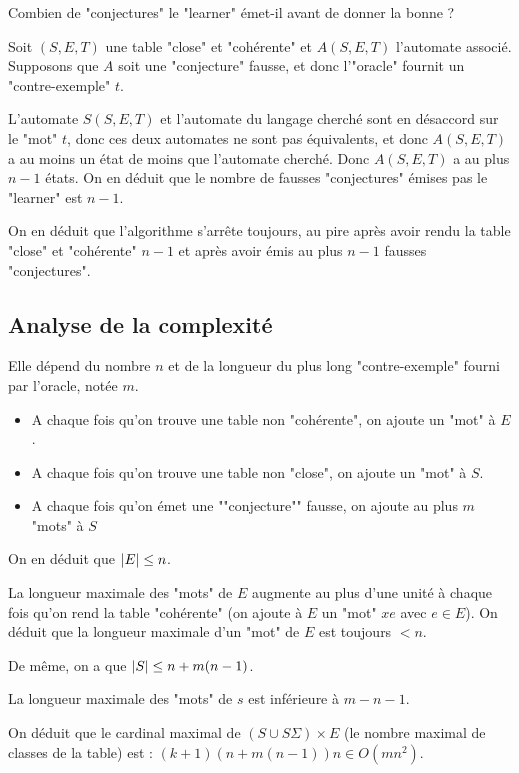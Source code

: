 Combien de "conjectures" le "learner" émet-il avant de donner la bonne ?

Soit $(S,E,T)$ une table "close" et "cohérente" et $A(S,E,T)$ l'automate associé.
Supposons que $A$ soit une "conjecture" fausse, et donc l'"oracle" fournit un "contre-exemple" $t$.

L'automate $S(S,E,T)$ et l'automate du langage cherché sont en désaccord sur le "mot" $t$, donc ces deux automates
ne sont pas équivalents, et donc $A(S,E,T)$ a au moins un état de moins que l'automate cherché.
Donc $A(S,E,T)$ a au plus $n-1$ états. On en déduit que le nombre de fausses "conjectures" émises pas le "learner" est $n-1$.

On en déduit que l'algorithme s'arrête toujours, au pire après avoir rendu la table "close" et
"cohérente" $n-1$ et après avoir émis au plus $n-1$ fausses "conjectures".


\subsection{Analyse de la complexité}

Elle dépend du nombre $n$ et de la longueur du plus long "contre-exemple" fourni par l'oracle, notée $m$.


\begin{itemize}
	\item A chaque fois qu'on trouve une table non "cohérente", on ajoute un "mot" à $E$.
	\item A chaque fois qu'on trouve une table non "close", on ajoute un "mot" à $S$.
	\item A chaque fois qu'on émet une ""conjecture"" fausse, on ajoute au plus $m$ "mots" à $S$
\end{itemize}

On en déduit que $\left|E\right| \leq n$.

La longueur maximale des "mots" de $E$ augmente au plus d'une unité à chaque fois qu'on rend la table "cohérente"
(on ajoute à $E$ un "mot" $xe$ avec $e \in E$). On déduit que la longueur maximale d'un "mot" de $E$ est toujours $<n$.

De même, on a que  $\left|S\right| \leq n + m(n-1)$. %

La longueur maximale des "mots" de $s$ est inférieure à $m - n -1$.


On déduit que le cardinal maximal de $(S \cup S \Sigma) \times E$ (le nombre maximal de classes de la table) est : $(k+1)(n+m(n-1))n \in O(mn^2)$.


